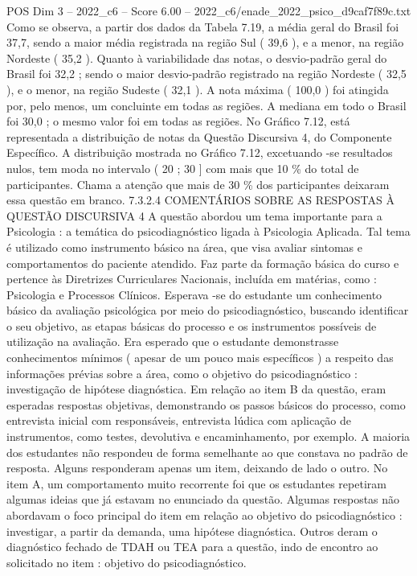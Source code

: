 \begin{textsample}{POS Dim 3 – 2022\_c6 – Score 6.00 – 2022\_c6/enade\_2022\_psico\_d9caf7f89c.txt}
Como se observa, a partir dos dados da Tabela 7.19, a média geral do Brasil foi 37,7, sendo a maior média registrada na região Sul ( 39,6 ), e a menor, na região Nordeste ( 35,2 ).
Quanto à variabilidade das notas, o desvio-padrão geral do Brasil foi 32,2 ; sendo o maior desvio-padrão registrado na região Nordeste ( 32,5 ), e o menor, na região Sudeste ( 32,1 ).
A nota máxima ( 100,0 ) foi atingida por, pelo menos, um concluinte em todas as regiões.
A mediana em todo o Brasil foi 30,0 ; o mesmo valor foi em todas as regiões.
No Gráfico 7.12, está representada a distribuição de notas da Questão Discursiva 4, do Componente Específico.
A distribuição mostrada no Gráfico 7.12, excetuando -se resultados nulos, tem moda no intervalo ( 20 ; 30 ] com mais que 10 \% do total de participantes.
Chama a atenção que mais de 30 \% dos participantes deixaram essa questão em branco. 7.3.2.4 COMENTÁRIOS SOBRE AS RESPOSTAS À QUESTÃO DISCURSIVA 4 A questão abordou um tema importante para a Psicologia : a temática do psicodiagnóstico ligada à Psicologia Aplicada.
Tal tema é utilizado como instrumento básico na área, que visa avaliar sintomas e comportamentos do paciente atendido.
Faz parte da formação básica do curso e pertence às Diretrizes Curriculares Nacionais, incluída em matérias, como : Psicologia e Processos Clínicos.
Esperava -se do estudante um conhecimento básico da avaliação psicológica por meio do psicodiagnóstico, buscando identificar o seu objetivo, as etapas básicas do processo e os instrumentos possíveis de utilização na avaliação.
Era esperado que o estudante demonstrasse conhecimentos mínimos ( apesar de um pouco mais específicos ) a respeito das informações prévias sobre a área, como o objetivo do psicodiagnóstico : investigação de hipótese diagnóstica.
Em relação ao item B da questão, eram esperadas respostas objetivas, demonstrando os passos básicos do processo, como entrevista inicial com responsáveis, entrevista lúdica com aplicação de instrumentos, como testes, devolutiva e encaminhamento, por exemplo.
A maioria dos estudantes não respondeu de forma semelhante ao que constava no padrão de resposta.
Alguns responderam apenas um item, deixando de lado o outro.
No item A, um comportamento muito recorrente foi que os estudantes repetiram algumas ideias que já estavam no enunciado da questão.
Algumas respostas não abordavam o foco principal do item em relação ao objetivo do psicodiagnóstico : investigar, a partir da demanda, uma hipótese diagnóstica.
Outros deram o diagnóstico fechado de TDAH ou TEA para a questão, indo de encontro ao solicitado no item : objetivo do psicodiagnóstico.

\end{textsample}

